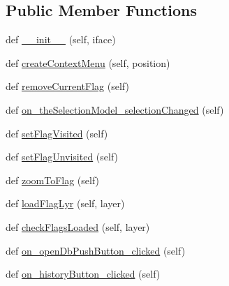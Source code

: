 \subsection*{Public Member Functions}
\begin{DoxyCompactItemize}
\item 
def \mbox{\hyperlink{class_dsg_tools_1_1_validation_tools_1_1validation__toolbox_1_1_validation_toolbox_ad21b33dbc72ba1a9bcd00b2598b35980}{\+\_\+\+\_\+init\+\_\+\+\_\+}} (self, iface)
\item 
def \mbox{\hyperlink{class_dsg_tools_1_1_validation_tools_1_1validation__toolbox_1_1_validation_toolbox_a6957567427f23a92c28e7c1aa93a0aa2}{create\+Context\+Menu}} (self, position)
\item 
def \mbox{\hyperlink{class_dsg_tools_1_1_validation_tools_1_1validation__toolbox_1_1_validation_toolbox_acaabb546a967dba84db62cab485eec4d}{remove\+Current\+Flag}} (self)
\item 
def \mbox{\hyperlink{class_dsg_tools_1_1_validation_tools_1_1validation__toolbox_1_1_validation_toolbox_a581a4673c90197d5caca915ca91fba8a}{on\+\_\+the\+Selection\+Model\+\_\+selection\+Changed}} (self)
\item 
def \mbox{\hyperlink{class_dsg_tools_1_1_validation_tools_1_1validation__toolbox_1_1_validation_toolbox_a394e5313bcb406184aba670e7ea22482}{set\+Flag\+Visited}} (self)
\item 
def \mbox{\hyperlink{class_dsg_tools_1_1_validation_tools_1_1validation__toolbox_1_1_validation_toolbox_a9cf6616d80de7833b2961f81a68b146a}{set\+Flag\+Unvisited}} (self)
\item 
def \mbox{\hyperlink{class_dsg_tools_1_1_validation_tools_1_1validation__toolbox_1_1_validation_toolbox_a52675cb46cbc4393a3fc4bbbef3cbc0e}{zoom\+To\+Flag}} (self)
\item 
def \mbox{\hyperlink{class_dsg_tools_1_1_validation_tools_1_1validation__toolbox_1_1_validation_toolbox_a27ccb8e739581f57ad7b112a937ffc0f}{load\+Flag\+Lyr}} (self, layer)
\item 
def \mbox{\hyperlink{class_dsg_tools_1_1_validation_tools_1_1validation__toolbox_1_1_validation_toolbox_a6b681c30fe3b3019d761f1e98c0617eb}{check\+Flags\+Loaded}} (self, layer)
\item 
def \mbox{\hyperlink{class_dsg_tools_1_1_validation_tools_1_1validation__toolbox_1_1_validation_toolbox_ae3bee93c9dc44493bbe962f14b23a223}{on\+\_\+open\+Db\+Push\+Button\+\_\+clicked}} (self)
\item 
def \mbox{\hyperlink{class_dsg_tools_1_1_validation_tools_1_1validation__toolbox_1_1_validation_toolbox_acc655a67a9c84fb981f456fb2b29c8bf}{on\+\_\+history\+Button\+\_\+clicked}} (self)

\end{DoxyCompactItemize}

